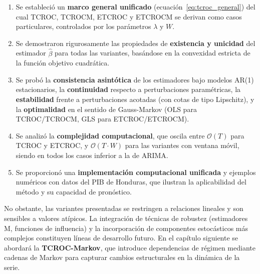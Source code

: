 \begin{enumerate}
    \item Se estableció un \textbf{marco general unificado} (ecuación~\ref{eq:tcroc_general}) del cual TCROC, TCROCM, ETCROC y ETCROCM se derivan como casos particulares, controlados por los parámetros $\lambda$ y $W$.

    \item Se demostraron rigurosamente las propiedades de \textbf{existencia y unicidad} del estimador $\hat{\beta}$ para todas las variantes, basándose en la convexidad estricta de la función objetivo cuadrática.

    \item Se probó la \textbf{consistencia asintótica} de los estimadores bajo modelos AR(1) estacionarios, la \textbf{continuidad} respecto a perturbaciones paramétricas, la \textbf{estabilidad} frente a perturbaciones acotadas (con cotas de tipo Lipschitz), y la \textbf{optimalidad} en el sentido de Gauss-Markov (OLS para TCROC/TCROCM, GLS para ETCROC/ETCROCM).

    \item Se analizó la \textbf{complejidad computacional}, que oscila entre \(\mathcal{O}(T)\) para TCROC y ETCROC, y \(\mathcal{O}(T \cdot W)\) para las variantes con ventana móvil, siendo en todos los casos inferior a la de ARIMA.

    \item Se proporcionó una \textbf{implementación computacional unificada} y ejemplos numéricos con datos del PIB de Honduras, que ilustran la aplicabilidad del método y su capacidad de pronóstico.
\end{enumerate}

No obstante, las variantes presentadas se restringen a relaciones lineales y son sensibles a valores atípicos. La integración de técnicas de robustez (estimadores M, funciones de influencia) y la incorporación de componentes estocásticos más complejos constituyen líneas de desarrollo futuro. En el capítulo siguiente se abordará la \textbf{TCROC-Markov}, que introduce dependencias de régimen mediante cadenas de Markov para capturar cambios estructurales en la dinámica de la serie.

